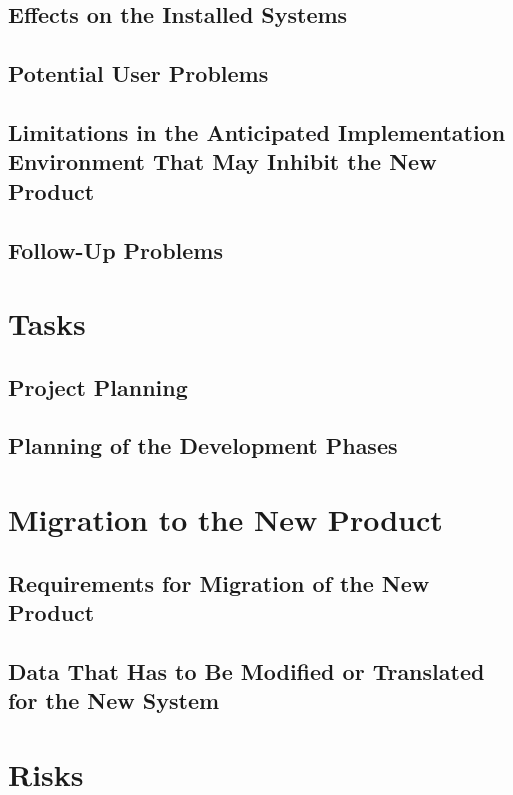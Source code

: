 \documentclass{scrreprt}
\begin{document}
\subsection{Effects on the Installed Systems}

\subsection{Potential User Problems}

\subsection{Limitations in the Anticipated Implementation Environment That May
            Inhibit the New Product}

\subsection{Follow-Up Problems}

\section{Tasks}

\subsection{Project Planning}

\subsection{Planning of the Development Phases}

\section{Migration to the New Product}

\subsection{Requirements for Migration of the New Product}

\subsection{Data That Has to Be Modified or Translated for the New
            System}

\section{Risks}
\end{document}

